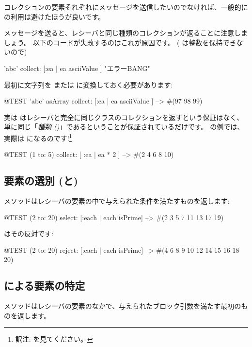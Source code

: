 \documentclass[a4paper,10pt,twoside]{book}
\begin{document}
コレクションの要素それぞれにメッセージを送信したいのでなければ、一般的に  の利用は避けたほうが良いです。

 メッセージを送ると、レシーバと同じ種類のコレクションが返ることに注意しましょう。
以下のコードが失敗するのはこれが原因です。
( は整数を保持できないので)
\begin{code}{}
'abc' collect: [:ea | ea asciiValue ]      "エラーBANG"
\end{code}
\noindent
最初に文字列を  または  に変換しておく必要があります:
\begin{code}{@TEST}
'abc' asArray collect: [:ea | ea asciiValue ] --> #(97 98 99)
\end{code}

実は  はレシーバと完全に同じクラスのコレクションを返すという保証はなく、単に同じ「\emph{種類 ()}」であるということが保証されているだけです。 の例では、実際は  になるのです!\footnote{訳注:  を見てください。}
\begin{code}{@TEST}
(1 to: 5) collect: [ :ea | ea * 2 ] --> #(2 4 6 8 10)
\end{code}

\subsection{要素の選別 (と)}

 メソッドはレシーバの要素の中で与えられた条件を満たすものを返します:

\begin{code}{@TEST}
(2 to: 20) select: [:each | each isPrime] --> #(2 3 5 7 11 13 17 19)
\end{code}

 はその反対です:
\begin{code}{@TEST}
(2 to: 20) reject: [:each | each isPrime] --> #(4 6 8 9 10 12 14 15 16 18 20)
\end{code}

\subsection{ による要素の特定}
 メソッドはレシーバの要素のなかで、与えられたブロック引数を満たす最初のものを返します。
\end{document}
